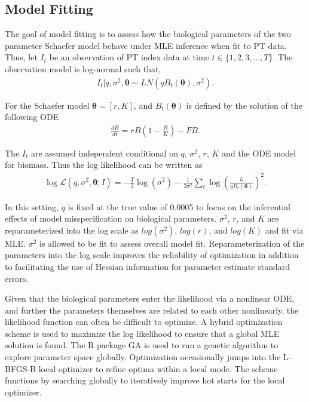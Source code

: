 \documentclass[12pt]{article}
\begin{document}
%
\clearpage
\subsection{Model Fitting\label{modelFit}}

%
The goal of model fitting is to assess how the biological parameters of the 
two parameter Schaefer model behave under MLE inference when fit to PT data. 
Thus, let $I_t$ be an observation of PT index data at time $t\in\{1,2, 3,..., T\}$. The observation 
model is log-normal such that,
%
\begin{align}
I_t| q, \sigma^2, \bm{\theta} \sim LN(qB_t(\bm{\theta}), \sigma^2).
\end{align}

For the Schaefer model $\bm{\theta}=[r, K]$, and $B_t(\bm{\theta})$ is defined 
by the solution of the following ODE
%
\begin{align}
\frac{dB}{dt} = r B \left(1-\frac{B}{K}\right) - FB. \label{odeS}
\end{align}

The $I_t$ are assumed independent conditional on $q$, $\sigma^2$, $r$, $K$ 
and the ODE model for biomass. Thus the log likelihood can be written as 
%
\begin{align}
\log\mathcal{L}(q, \sigma^2, \bm{\theta}; I) = - \frac{T}{2}\log(\sigma^2) - \frac{1}{2\sigma^2}\sum_t \log\left(\frac{I_t}{qB_t(\bm{\theta})}\right)^2. \label{logLike}
\end{align}

%
In this setting, $q$ is fixed at the true value of 0.0005 to focus on the 
inferential effects of model misspecification on biological parameters. 
$\sigma^2$, $r$, and $K$ are reparameterized into the log scale as 
$log(\sigma^2)$, $log(r)$, and $log(K)$ and fit via MLE. $\sigma^2$ is
allowed to be fit to assess overall model fit. Reparameterization 
of the parameters into the log scale improves the reliability of optimization
in addition to facilitating the use of Hessian information for parameter 
estimate standard errors.

%
Given that the biological parameters enter the likelihood via a nonlinear ODE, 
and further the parameters themselves are related to each other nonlinearly, 
the likelihood function can often be difficult to optimize. A hybrid optimization 
scheme is used to maximize the log likelihood to ensure that a global MLE solution 
is found. The R package GA  is 
used to run a genetic algorithm to explore parameter space globally. 
Optimization occasionally jumps into the L-BFGS-B local optimizer to refine 
optima within a local mode. The scheme functions by searching globally to 
iteratively improve hot starts for the local optimizer. 
\end{document}
